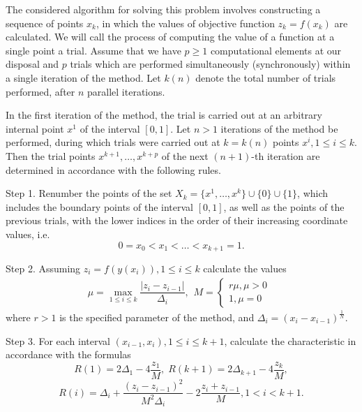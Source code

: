 \documentclass{svproc}
\begin{document}
The considered algorithm for solving this problem involves constructing a sequence of points \(x_k\), in which the values of objective function \(z_k = f(x_k)\) are calculated. We will call the process of computing the value of a function at a single point a trial. Assume that we have \(p\geqslant 1\) computational elements at our disposal and \(p\) trials which are performed simultaneously (synchronously) within a single iteration of the method. Let \(k(n)\) denote the total number of trials performed, after \(n\) parallel iterations.

In the first iteration of the method, the trial is carried out at an arbitrary internal point \(x^1\) of the interval \([0,1]\). Let \(n>1\) iterations of the method be performed, during which trials were carried out at \(k = k(n)\) points \(x^i, 1\leqslant i\leqslant k\). Then the trial points  \(x^{k+1},\dotsc,x^{k+p}\) of the next \((n+1)\)-th iteration are determined in accordance with the following rules.

Step 1. Renumber the points of the set \(X_k=\{x^1,\dotsc,x^k\}\cup\{0\}\cup\{1\}\), which includes the boundary points of the interval \([0,1]\), as well as the points of the previous trials, with the lower indices in the order of their increasing coordinate values, i.e.
\begin{displaymath}
0=x_0<x_1<\dotsc<x_{k+1}=1.
\end{displaymath}

Step 2. Assuming \(z_i=f(y(x_i)),1\leqslant i\leqslant k\) calculate the values
\begin{displaymath}
\label{step2}
\mu=\max_{1\leqslant i\leqslant k}\dfrac{|z_i-z_{i-1}|}{\Delta_i},
\begin{matrix}
    M = 
    \left\{
    \begin{matrix}
    r\mu,\mu>0 \\
    1,\mu=0
    \end{matrix} \right.
    \end{matrix}
\end{displaymath}
where \(r > 1\) is the specified parameter of the method, and \(\Delta_i=(x_i-x_{i-1})^\frac{1}{N}\). 

Step 3. For each interval \((x_{i-1},x_i),1\leqslant i\leqslant k+1\), calculate the characteristic in accordance with the formulas 
\begin{displaymath}
\label{step3_1}
R(1)=2\Delta_1-4\dfrac{z_1}{M}, \; R(k+1)=2\Delta_{k+1}-4\dfrac{z_k}{M},
\end{displaymath}
\begin{displaymath}
\label{step3_2}
R(i)=\Delta_i+\dfrac{(z_i-z_{i-1})^2}{M^2\Delta_i}-2\dfrac{z_i+z_{i-1}}{M},1<i<k+1.
\end{displaymath}
\end{document}
